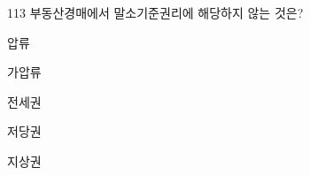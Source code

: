 \begin{question}{113}
부동산경매에서 말소기준권리에 해당하지 않는 것은?
\begin{choices}
  \item 압류
  \item 가압류
  \item 전세권
  \item 저당권
  \item 지상권
\end{choices}
\end{question}
